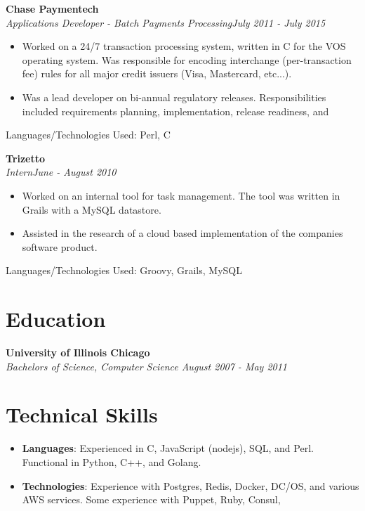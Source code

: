 \documentclass[10pt]{res}
\begin{document}
\begin{resume}
\textbf{Chase Paymentech} \\
{\sl \small{Applications Developer - Batch Payments Processing\hfill    July 2011 - July 2015 }}
  \begin{itemize} \itemsep -1pt %
    \item Worked on a 24/7 transaction processing system, written in C for the VOS operating system. Was responsible for encoding interchange (per-transaction fee) rules for all major credit issuers (Visa, Mastercard, etc...).
    \item Was a lead developer on bi-annual regulatory releases. Responsibilities included requirements planning, implementation, release readiness, and 
  \end{itemize} \vspace{-6pt}
\small{Languages/Technologies Used: Perl, C}

\textbf{Trizetto} \\
{\sl \small{Intern\hfill June - August 2010 }}
  \begin{itemize} \itemsep -1pt %
    \item Worked on an internal tool for task management. The tool was written in Grails with a MySQL datastore.
    \item Assisted in the research of a cloud based implementation of the companies software product.
  \end{itemize} \vspace{-6pt}
\small{Languages/Technologies Used: Groovy, Grails, MySQL}

\section{\large{Education}}
\vspace{8pt} 
\textbf{University of Illinois Chicago} \\
{\sl Bachelors of Science, Computer Science \hfill August 2007 - May 2011 } \\
  
\section{\large{Technical Skills}}
\vspace{16pt}
\begin{itemize} \itemsep -2pt %
  \item \textbf{Languages}: Experienced in C, JavaScript (nodejs), SQL, and Perl. Functional in Python, C++, and Golang.
  \item \textbf{Technologies}: Experience with Postgres, Redis, Docker, DC/OS, and various AWS services. Some experience with Puppet, Ruby, Consul,
\end{itemize}

\end{resume} 
\end{document}
